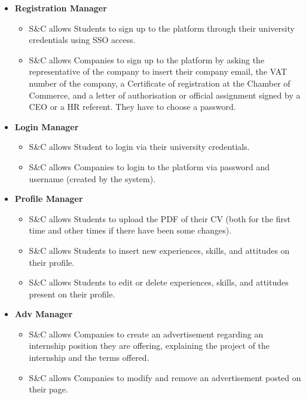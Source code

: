 \begin{itemize}
    \item \textbf{Registration Manager}
        \begin{itemize}
            \item[\text{[R1]}] S\&C allows Students to sign up to the platform through their university credentials using SSO access.
            \item[\text{[R3]}] S\&C allows Companies to sign up to the platform by asking the representative of the company to insert their company email, the VAT number of the company, a Certificate of registration at the Chamber of Commerce, and a letter of authorisation or official assignment signed by a CEO or a HR referent. They have to choose a password.
        \end{itemize}
        
    \item \textbf{Login Manager}
        \begin{itemize}
            \item[\text{[R2]}] S\&C allows Student to login via their university credentials.
            \item[\text{[R4]}] S\&C allows Companies to login to the platform via password and username (created by the system).
        \end{itemize}

        \item \textbf{Profile Manager}
        \begin{itemize}
            \item[\text{[R5]}] S\&C allows Students to upload the PDF of their CV (both for the first time and other times if there have been some changes).
            \item[\text{[R6]}] S\&C allows Students to insert new experiences, skills, and attitudes on their profile.
            \item[\text{[R7]}] S\&C allows Students to edit or delete experiences, skills, and attitudes present on their profile.
        \end{itemize}

        \item \textbf{Adv Manager}
        \begin{itemize}
            \item[\text{[R8]}] S\&C allows Companies to create an advertisement regarding an internship position they are offering, explaining the project of the internship and the terms offered.
            \item[\text{[R9]}] S\&C allows Companies to modify and remove an advertisement posted on their page.
        \end{itemize}


\end{itemize}

